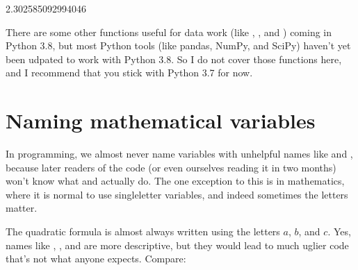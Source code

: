 \documentclass[letterpaper,10pt,english]{sphinxmanual}
\begin{document}
\begin{sphinxVerbatim}[commandchars=\\\{\}]
    
\end{sphinxVerbatim}

\begin{sphinxVerbatim}[commandchars=\\\{\}]
2.302585092994046
\end{sphinxVerbatim}

There are some other functions useful for data work (like , , and ) coming in Python 3.8, but most Python tools (like pandas, NumPy, and SciPy) haven’t yet been udpated to work with Python 3.8.  So I do not cover those functions here, and I recommend that you stick with Python 3.7 for now.


\section{Naming mathematical variables}
\label{\detokenize{chapter-9-math-and-stats:naming-mathematical-variables}}
In programming, we almost never name variables with unhelpful names like  and , because later readers of the code (or even ourselves reading it in two months) won’t know what  and  actually do.  The one exception to this is in mathematics, where it is normal to use single\sphinxhyphen{}letter variables, and indeed sometimes the letters matter.

  The quadratic formula is almost always written using the letters \(a\), \(b\), and \(c\).  Yes, names like , , and  are more descriptive, but they would lead to much uglier code that’s not what anyone expects.  Compare:
\end{document}
